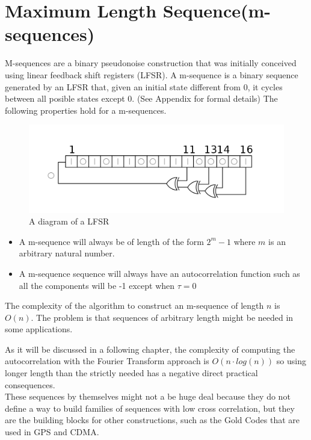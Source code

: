 \section{Maximum Length Sequence(m-sequences)}

M-sequences are a binary pseudonoise construction that was initially conceived using
linear feedback shift registers (LFSR). A m-sequence is a binary sequence generated
by an LFSR that, given an initial state different from 0, it cycles between all
posible states except 0. (See Appendix for formal details) The following properties
hold for a m-sequences.

\begin{figure}
  \includegraphics[scale=0.5]{Chapters/PRN_generation/LFSR-F16.svg.png}
  \caption{A diagram of a LFSR}
  \label{}
\end{figure}

\begin{itemize}
\item   A m-sequence will always be of length of the form $2^{m}-1$ where $m$ is an
  arbitrary natural number.
\item A m-sequence sequence will always have an autocorrelation function such as
  all the components will be -1 except when $\tau = 0$
\end{itemize}
The complexity of the algorithm to construct an m-sequence of length $n$ is $O(n)$. The problem is
that sequences of arbitrary length might be needed in some applications.

 As it will be discussed in a following chapter, the complexity of computing the
autocorrelation with the Fourier Transform approach is $O(n \cdot log(n))$ so using longer length than the strictly needed  has a  negative direct practical consequences.\\

These sequences by themselves might not a be huge deal because they do not define a way to build families of sequences with low cross correlation, but they are the
building blocks for other constructions, such as the Gold Codes that are used in GPS and  CDMA.
